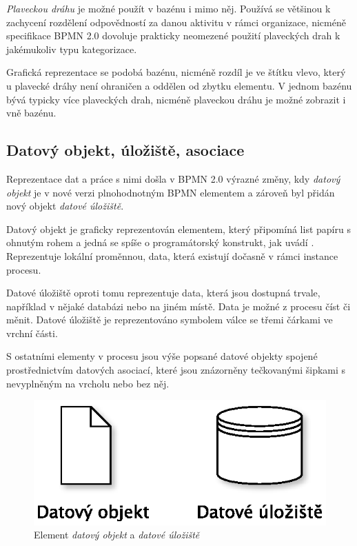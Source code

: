 \textit{Plaveckou dráhu} je možné použít v bazénu i mimo něj. Používá se většinou k zachycení rozdělení odpovědností za danou aktivitu v rámci organizace, nicméně specifikace BPMN 2.0 dovoluje prakticky neomezené použití plaveckých drah k jakémukoliv typu kategorizace. \cite{Silver2011}

Grafická reprezentace se podobá bazénu, nicméně rozdíl je ve štítku vlevo, který u plavecké dráhy není ohraničen a oddělen od zbytku elementu. V jednom bazénu bývá typicky více plaveckých drah, nicméně plaveckou dráhu je možné zobrazit i vně bazénu.

\subsection{Datový objekt, úložiště, asociace}
Reprezentace dat a práce s nimi došla v BPMN 2.0 výrazné změny, kdy \textit{datový objekt} je v nové verzi plnohodnotným BPMN elementem a zároveň byl přidán nový objekt \textit{datové úložiště}.

Datový objekt je graficky reprezentován elementem, který připomíná list papíru s ohnutým rohem a jedná se spíše o programátorský konstrukt, jak uvádí \cite{Silver2011}. Reprezentuje lokální proměnnou, data, která existují dočasně v rámci instance procesu.

Datové úložiště oproti tomu reprezentuje data, která jsou dostupná trvale, například v nějaké databázi nebo na jiném místě. Data je možné z procesu číst či měnit. Datové úložiště je reprezentováno symbolem válce se třemi čárkami ve vrchní části.

S ostatními elementy v procesu jsou výše popsané datové objekty spojené prostřednictvím datových asociací, které jsou znázorněny tečkovanými šipkami s nevyplněným  na vrcholu nebo bez něj.

\begin{figure}[htbp]\centering
\includegraphics[scale=0.7]{obrazky/data-object-store}
\caption{Element \textit{datový objekt} a \textit{datové úložiště}}
\label{fig:datove_objekty}
\end{figure}

